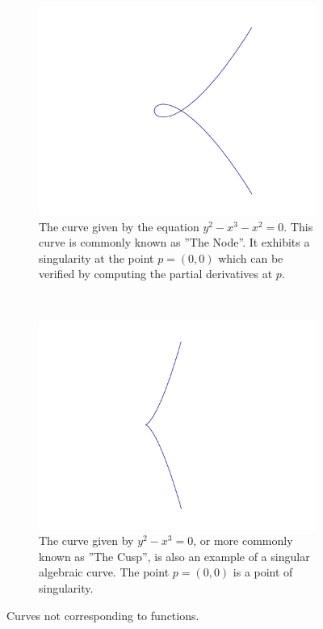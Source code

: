 \documentclass{article}
\begin{document}
    \begin{figure}[h!]
        \centering
        \begin{subfigure}[t]{0.45\textwidth}
            \includegraphics[width=\textwidth]{pictures/node.pdf}
            \caption{The curve given by the equation $y^2 - x^3 - x^2 = 0$.
            This curve is commonly known as ''The Node''. It exhibits a
            singularity at the point $p = (0, 0)$ which can be verified by
            computing the partial derivatives at $p$.}
            \label{fig:node}
        \end{subfigure}        
        ~
        \begin{subfigure}[t]{0.45\textwidth}
            \includegraphics[width=\textwidth]{pictures/cusp.pdf}
            \caption{The curve given by $y^2 - x^3 = 0$, or more commonly known
            as ''The Cusp'', is also an example of a singular algebraic curve.
        The point $p = (0, 0)$ is a point of singularity.}
        \end{subfigure}
        \caption{Curves not corresponding to functions.}
        \label{fig:algebraic_curves}
    \end{figure}
    
\end{document}
